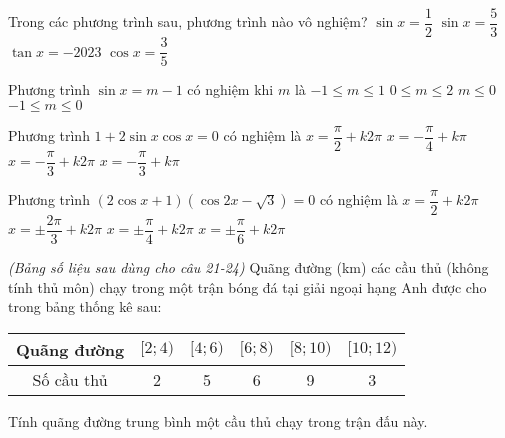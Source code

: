 \begin{ex}%
Trong các phương trình sau, phương trình nào vô nghiệm?
\choice 
{$\sin x=\dfrac{1}{2}$}
{\True $\sin x=\dfrac{5}{3}$}
{$\tan x=-2023$}
{$\cos x=\dfrac{3}{5}$}
\end{ex}
\begin{ex}%
Phương trình $\sin x=m-1$ có nghiệm khi $m$ là
\choice
{$-1 \leq m \leq 1$}
{\True $0 \leq m \leq 2$}
{$m \leq 0$}
{$-1 \leq m \leq 0$}
\end{ex}
\begin{ex}%
Phương trình $1+2 \sin x \cos x=0$ có nghiệm là
\choice
{$x=\dfrac{\pi}{2}+k 2 \pi$}
{\True $x=-\dfrac{\pi}{4}+k \pi$}
{$x=-\dfrac{\pi}{3}+k 2 \pi$}
{$x=-\dfrac{\pi}{3}+k \pi$}
\end{ex}
\begin{ex}%
Phương trình $(2 \cos x+1)(\cos 2 x-\sqrt{3})=0$ có nghiệm là
\choice
{$x=\dfrac{\pi}{2}+k 2 \pi$}
{\True $x= \pm \dfrac{2 \pi}{3}+k 2 \pi$}
{$x= \pm \dfrac{\pi}{4}+k 2 \pi$}
{$x= \pm \dfrac{\pi}{6}+k 2 \pi$}
\end{ex}
\begin{ex}%
\textit{(Bảng số liệu sau dùng cho câu 21-24)}
Quãng đường (km) các cầu thủ (không tính thủ môn) chạy trong một trận bóng đá tại giải ngoại hạng Anh được cho trong bảng thống kê sau:
	\begin{center}
		\begin{tabular}{|c|c|c|c|c|c|}
			\hline Quãng đường & {$[2 ; 4)$} & {$[4 ; 6)$} & {$[6 ; 8)$} & {$[8 ; 10)$} & {$[10 ; 12)$} \\
			\hline Số cầu thủ & 2 & 5 & 6 & 9 & 3 \\
			\hline
		\end{tabular}
	\end{center}
	Tính quãng đường trung bình một cầu thủ chạy trong trận đấu này.
\end{ex}
